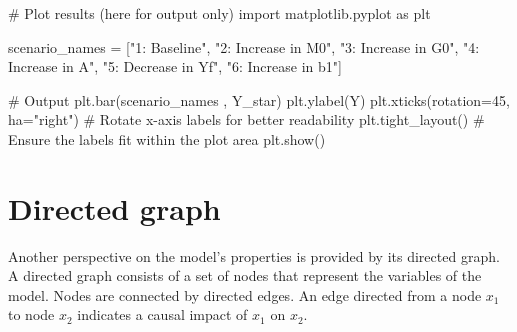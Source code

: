 \documentclass[
  letterpaper,
  DIV=11,
  numbers=noendperiod]{scrreprt}
\newenvironment{Shaded}{\begin{snugshade}}{\end{snugshade}}
\newcommand{\CommentTok}[1]{\textcolor[rgb]{0.37,0.37,0.37}{#1}}
\newcommand{\DecValTok}[1]{\textcolor[rgb]{0.68,0.00,0.00}{#1}}
\newcommand{\ImportTok}[1]{\textcolor[rgb]{0.00,0.46,0.62}{#1}}
\newcommand{\NormalTok}[1]{\textcolor[rgb]{0.00,0.23,0.31}{#1}}
\newcommand{\OperatorTok}[1]{\textcolor[rgb]{0.37,0.37,0.37}{#1}}
\newcommand{\StringTok}[1]{\textcolor[rgb]{0.13,0.47,0.30}{#1}}
\begin{document}
\begin{tcolorbox}[enhanced jigsaw, titlerule=0mm, breakable, bottomrule=.15mm, toprule=.15mm, colbacktitle=quarto-callout-note-color!10!white, rightrule=.15mm, toptitle=1mm, opacityback=0, left=2mm, coltitle=black, title=\textcolor{quarto-callout-note-color}{\faInfo}\hspace{0.5em}{Python code}, colframe=quarto-callout-note-color-frame, opacitybacktitle=0.6, leftrule=.75mm, bottomtitle=1mm, arc=.35mm, colback=white]

\begin{Shaded}
\begin{Highlighting}[]
\CommentTok{\# Plot results (here for output only)}
\ImportTok{import}\NormalTok{ matplotlib.pyplot }\ImportTok{as}\NormalTok{ plt}

\NormalTok{scenario\_names }\OperatorTok{=}\NormalTok{ [}\StringTok{"1: Baseline"}\NormalTok{, }\StringTok{"2: Increase in M0"}\NormalTok{, }\StringTok{"3: Increase in G0"}\NormalTok{, }
                  \StringTok{"4: Increase in A"}\NormalTok{, }\StringTok{"5: Decrease in Yf"}\NormalTok{, }\StringTok{"6: Increase in b1"}\NormalTok{]}

\CommentTok{\# Output}
\NormalTok{plt.bar(scenario\_names , Y\_star)}
\NormalTok{plt.ylabel(}\StringTok{\textquotesingle{}Y\textquotesingle{}}\NormalTok{)}
\NormalTok{plt.xticks(rotation}\OperatorTok{=}\DecValTok{45}\NormalTok{, ha}\OperatorTok{=}\StringTok{"right"}\NormalTok{)  }\CommentTok{\# Rotate x{-}axis labels for better readability}
\NormalTok{plt.tight\_layout()  }\CommentTok{\# Ensure the labels fit within the plot area}
\NormalTok{plt.show()}
\end{Highlighting}
\end{Shaded}

\end{tcolorbox}

\section{Directed graph}\label{directed-graph}

Another perspective on the model's properties is provided by its
directed graph. A directed graph consists of a set of nodes that
represent the variables of the model. Nodes are connected by directed
edges. An edge directed from a node \(x_1\) to node \(x_2\) indicates a
causal impact of \(x_1\) on \(x_2\).
\end{document}
